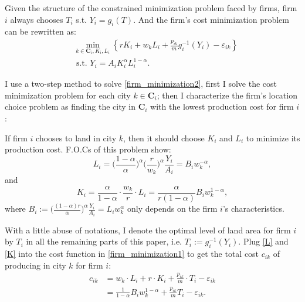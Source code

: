 Given the structure of the constrained minimization problem faced by firms,
firm $i$ always chooses $T_i$ s.t. $Y_i = g_{i}(T)$. And the firm's cost minimization problem
can be rewritten as:
\begin{equation}
    \begin{aligned}
         & \min _{k \in \mathbf{C}_{i}, K_{i}, L_{i}}
        \left\{r K_{i}+w_{k} L_{i}+\frac{p_{i k}}{m} g_{i}^{-1}(Y_i)
        -\varepsilon_{i k}\right\}                                       \\
         & \text { s.t. } Y_{i} = A_{i} K_{i}^{\alpha} L_{i}^{1-\alpha}.
    \end{aligned}
    \label{firm_minimization2}
\end{equation}

I use a two-step method to solve \eqref{firm_minimization2}, first I
solve the cost minimization problem for each city $k \in \mathbf{C}_i$;
then I characterize the firm's location choice problem as finding the city in $\mathbf{C}_i$ with the
lowest production cost for firm $i$ :
\bnt
\item If firm $i$ chooses to land in city $k$, then it should choose $K_i$ and $L_i$ to
minimize its production cost.
F.O.Cs of this problem show:
\begin{equation}
    L_i = \Big(\frac{1-\alpha}{\alpha}\Big)^{\alpha}\Big(\frac{r}{w_k}\Big)
    ^{\alpha}\frac{Y_i}{A_i} =
    B_{i} w_{k}^{-\alpha},
    \label{L}
\end{equation}
and
\begin{equation}
    K_i = \frac{\alpha}{1-\alpha}\cdot \frac{w_k}{r} \cdot L_i
    =\frac{\alpha }{r(1-\alpha)} B_{i} w_{k}^{1-\alpha},
    \label{K}
\end{equation}
where $B_i:=\Big(\frac{(1-\alpha)r}{\alpha}\Big)^{\alpha}\frac{Y_i}{A_i}
    =L_{i}w_{k}^{\alpha}$ only depends on the firm $i$'s characteristics.

\item With a little abuse of notations, I denote the optimal level of land area for firm $i$
by $T_i$ in all the remaining parts of this paper, i.e. $T_i := g_{i}^{-1}(Y_i)$.
Plug \eqref{L} and \eqref{K} into the cost function in \eqref{firm_minimization1}
to get the total cost $c_{ik}$ of producing in city $k$ for firm $i$:
\begin{equation}
    \begin{aligned}
        c_{ik} & = w_k \cdot L_{i} + r \cdot K_{i}
        + \frac{p_{ik}}{m} \cdot T_{i} - \varepsilon_{ik}  \\
               & = \frac{1}{1-\alpha}B_{i}w_{k}^{1-\alpha}
        + \frac{p_{ik}}{m}T_{i} - \varepsilon_{ik}.
    \end{aligned}
    \label{city_cost}
\end{equation}

